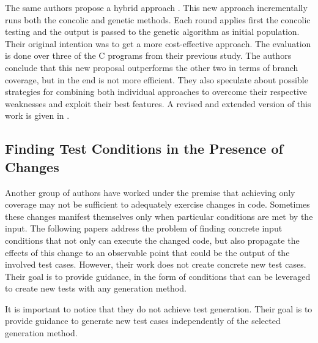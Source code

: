 The same authors propose a hybrid approach \cite{xu2011hybrid}. 
This new approach incrementally runs both the concolic and genetic methods. 
Each round applies first the concolic testing and the output is passed to the genetic algorithm as initial population. 
Their original intention was to get a more cost-effective approach. 
The evaluation is done over three of the C programs from their previous study.
The authors conclude that this new proposal outperforms the other two in terms of branch coverage, but in the end is not more efficient. 
They also speculate about possible strategies for combining both individual approaches to overcome their respective weaknesses and exploit their best features. 
A revised and extended version of this work is given in \cite{xu2015directed}.

\subsection{Finding Test Conditions in the Presence of Changes}
\label{subsec:sota:category-2:finding-test-conditions}

Another group of authors have worked under the premise that achieving only coverage may not be sufficient to adequately exercise changes in code. 
Sometimes these changes manifest themselves only when particular conditions are met by the input. 
The following papers address the problem of finding concrete input conditions that not only can execute the changed code, but also propagate the effects of this change to an observable point that could be the output of the involved test cases. 
However, their work does not create concrete new test cases. 
Their goal is to provide guidance, in the form of conditions that can be leveraged to create new tests with any generation method.

It is important to notice that they do not achieve test generation. 
Their goal is to provide guidance to generate new test cases independently of the selected generation method.


